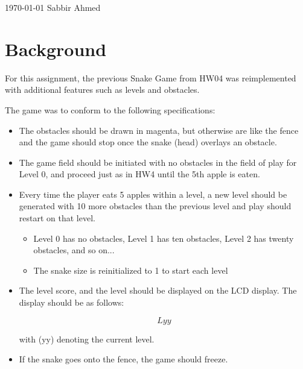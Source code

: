 \documentclass[paper=usletter, fontsize=12pt]{article}
\begin{document}
    {\today} {Sabbir Ahmed}
    \vspace{-0.1in}

    \section{Background} For this assignment, the previous Snake Game from HW04
    was reimplemented with additional features such as levels and obstacles.

    The game was to conform to the following specifications:

    \begin{itemize}

        \item The obstacles should be drawn in magenta, but otherwise are like
        the fence and the game should stop once the snake (head) overlays an
        obstacle.

        \item The game field should be initiated with no obstacles in the field
        of play for Level 0, and proceed just as in HW4 until the 5th apple is
        eaten.

        \item Every time the player eats 5 apples within a level, a new level
        should be generated with 10 more obstacles than the previous level and
        play should restart on that level.

            \begin{itemize}

                \item Level 0 has no obstacles, Level 1 has ten obstacles,
                Level 2 has twenty obstacles, and so on...

                \item The snake size is reinitialized to 1 to start each level

            \end{itemize}

        \item The level score, and the level should be displayed on the LCD
        display. The display should be as follows:

            \[ Lyy \]

            with (yy) denoting the current level.

        \item If the snake goes onto the fence, the game should freeze.


\end{itemize}
\end{document}
